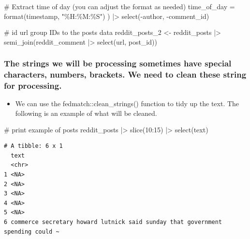 \documentclass[
  letterpaper,
  DIV=11,
  numbers=noendperiod]{scrartcl}
\newenvironment{Shaded}{\begin{snugshade}}{\end{snugshade}}
\newcommand{\AttributeTok}[1]{\textcolor[rgb]{0.40,0.45,0.13}{#1}}
\newcommand{\CommentTok}[1]{\textcolor[rgb]{0.37,0.37,0.37}{#1}}
\newcommand{\DecValTok}[1]{\textcolor[rgb]{0.68,0.00,0.00}{#1}}
\newcommand{\FunctionTok}[1]{\textcolor[rgb]{0.28,0.35,0.67}{#1}}
\newcommand{\NormalTok}[1]{\textcolor[rgb]{0.00,0.23,0.31}{#1}}
\newcommand{\OtherTok}[1]{\textcolor[rgb]{0.00,0.23,0.31}{#1}}
\newcommand{\SpecialCharTok}[1]{\textcolor[rgb]{0.37,0.37,0.37}{#1}}
\newcommand{\StringTok}[1]{\textcolor[rgb]{0.13,0.47,0.30}{#1}}
\providecommand{\tightlist}{%
  \setlength{\itemsep}{0pt}\setlength{\parskip}{0pt}}\usepackage{longtable,booktabs,array}
\begin{document}
\begin{Shaded}
\begin{Highlighting}[]
    \CommentTok{\# Extract time of day (you can adjust the format as needed)}
    \AttributeTok{time\_of\_day =} \FunctionTok{format}\NormalTok{(timestamp, }\StringTok{"\%H:\%M:\%S"}\NormalTok{)}
\NormalTok{  ) }\SpecialCharTok{|\textgreater{}}
  \FunctionTok{select}\NormalTok{(}\SpecialCharTok{{-}}\NormalTok{author, }\SpecialCharTok{{-}}\NormalTok{comment\_id) }


\CommentTok{\# id url group IDs to the posts data}
\NormalTok{reddit\_posts\_2 }\OtherTok{\textless{}{-}}\NormalTok{ reddit\_posts }\SpecialCharTok{|\textgreater{}} 
  \FunctionTok{semi\_join}\NormalTok{(reddit\_comment }\SpecialCharTok{|\textgreater{}} \FunctionTok{select}\NormalTok{(url, post\_id)) }
\end{Highlighting}
\end{Shaded}

\subsubsection{The strings we will be processing sometimes have special
characters, numbers, brackets. We need to clean these string for
processing.}\label{the-strings-we-will-be-processing-sometimes-have-special-characters-numbers-brackets.-we-need-to-clean-these-string-for-processing.}

\begin{itemize}
\tightlist
\item
  We can use the fedmatch::clean\_strings() function to tidy up the
  text. The following is an example of what will be cleaned.
\end{itemize}

\begin{Shaded}
\begin{Highlighting}[]
\CommentTok{\# print example of posts}
\NormalTok{reddit\_posts }\SpecialCharTok{|\textgreater{}} 
  \FunctionTok{slice}\NormalTok{(}\DecValTok{10}\SpecialCharTok{:}\DecValTok{15}\NormalTok{) }\SpecialCharTok{|\textgreater{}} 
  \FunctionTok{select}\NormalTok{(text) }
\end{Highlighting}
\end{Shaded}

\begin{verbatim}
# A tibble: 6 x 1
  text                                                                          
  <chr>                                                                         
1 <NA>                                                                          
2 <NA>                                                                          
3 <NA>                                                                          
4 <NA>                                                                          
5 <NA>                                                                          
6 commerce secretary howard lutnick said sunday that government spending could ~
\end{verbatim}
\end{document}

